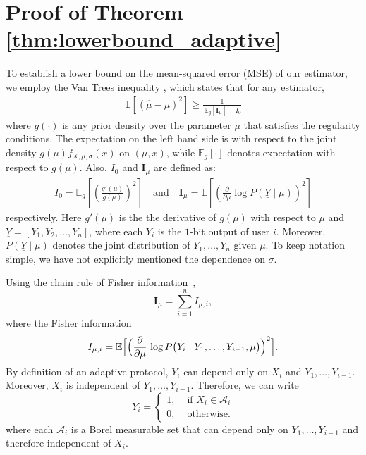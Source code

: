 \documentclass[10pt]{article} %
\theoremstyle{plain}
\theoremstyle{definition}
\theoremstyle{remark}
\newcommand{\bE}{\mathbb E}
\newcommand{\bfI}{\mathbf I}
\newcommand{\cA}{\mathcal A}
\begin{document}

\section{Proof of Theorem \ref{thm:lowerbound_adaptive}}\label{sec:prf_lowerbound_adaptive}
To establish a lower bound on the mean-squared error (MSE) of our estimator, we employ the Van Trees inequality \citep{bj/1186078362, van2004detection}, 
which states that for any estimator,
\begin{align}
\bE \left[ \left( \hat{\mu} - \mu \right)^2 \right]\geq \frac{1}{\, \bE_{g} \left[\bfI_{\mu}\right] + I_{0} } \label{lower_bound_final-temp1}
\end{align}
where $g(\cdot)$ is any prior density over the parameter \(\mu\) that satisfies the regularity conditions. The expectation on the left hand side is  with respect to the joint density $g(\mu)f_{X,\mu,\sigma}(x)$ on $(\mu,x)$, while $\bE_g[\cdot]$ denotes expectation with respect to $g(\mu)$. Also, \(I_{0}\) and \(\bfI_{\mu}\)  are defined as:
\begin{align*}
I_0 =
\bE_{g}\left[\left(\frac{g'(\mu)}{g(\mu)}\right)^2\right] \quad \text{and} \quad \bfI_{\mu} = \bE \left[ \left( \frac{\partial}{\partial \mu} \log P(\underline{Y} \mid \mu) \right)^2 \right]
\end{align*}
respectively.
Here \(g'(\mu)\) is the the derivative of \(g(\mu)\) with respect to \(\mu\) and \(\underline{Y} = [Y_1, Y_2, \dots, Y_n]\), where each $Y_i$ is the $1$-bit output of user $i$. Moreover, $P(\underline{Y} \mid \mu)$ denotes the joint distribution of $Y_1,\ldots,Y_n$ given $\mu$. To keep notation simple, we have not explicitly mentioned the dependence on $\sigma$.

Using the chain rule of Fisher information~\citep{zamir1998proof},
\begin{equation}\label{eq:chainrule_fisher}
    \bfI_{\mu}=\sum_{i=1}^n I_{\mu,i},
\end{equation}
where the Fisher information
\[
I_{\mu,i} =\bE \Bigl[ \Bigl( \frac{\partial}{\partial \mu}\,\log P\bigl(Y_i \mid Y_1, \ldots, Y_{i-1}, \mu\bigr) \Bigr)^{2} \Bigr].
\]
By definition of an adaptive protocol, $Y_i$ can depend only on $X_i$ and $Y_1,\ldots,Y_{i-1}$. Moreover, $X_i$ is independent of $Y_1,\ldots, Y_{i-1}$. Therefore, we can write 
\[
Y_i=\begin{cases}
    1, &\text{ if } X_i\in\cA_i\\
    0, &\text{ otherwise.}
\end{cases}
\]
where each $\cA_i$ is a Borel measurable set that can depend only on $Y_1,\ldots,Y_{i-1}$ and therefore independent of $X_i$.
\end{document}
